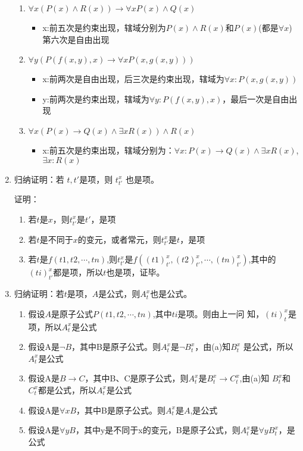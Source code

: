 \documentclass[UTF8]{ctexart}
\begin{document}
\begin{enumerate}
\begin{enumerate}
           \item $\forall x( P(x)\wedge R(x) ) \rightarrow  \forall xP(x) \wedge  Q(x)$
           \begin{itemize}
               \item x:前五次是约束出现，辖域分别为$P(x)\wedge R(x)$和$P(x)$(都是$\forall x$)
               第六次是自由出现
           \end{itemize}
           \item $\forall y( P(f(x, y), x) \rightarrow  \forall xP(x, g(x,y) ) )$
           \begin{itemize}
               \item x:前两次是自由出现，后三次是约束出现，辖域为$\forall x:P(x,g(x,y))$
               \item y:前两次是约束出现，辖域为$\forall y:P(f(x,y),x)$，最后一次是自由出现
           \end{itemize}
           \item $\forall x( P(x) \rightarrow  Q(x) \wedge  \exists xR(x) ) \wedge  R(x)$
           \begin{itemize}
               \item x:前五次是约束出现，辖域分别为：$\forall x:P(x)\rightarrow Q(x)\wedge \exists xR(x)$,
               $\exists x:R(x)$
           \end{itemize}
        \end{enumerate}
       \item 归纳证明：若 $t,t'$是项，则 $t^x_{t'}$ 也是项。   
       
       证明：
       \begin{enumerate}
           \item 若$t$是$x$，则$t^{x}_{t'}$是$t'$，是项
           \item 若$t$是不同于$x$的变元，或者常元，则$t^{x}_{t'}$是$t$，是项
           \item 若$t$是$f(t1,t2,\cdots ,tn)$,则$t^{x}_{t'}$是$f((t1)^{x}_{t'},(t2)^{x}_{t'},\cdots ,(tn)^{x}_{t'})$,其中的
           $(ti)^{x}_{t'}$都是项，所以$t$也是项，证毕。
       \end{enumerate}
       \item  归纳证明：若$t$是项，$A$是公式，则$A^x_t$也是公式。
       \begin{enumerate}
           \item 假设$A$是原子公式$P(t1,t2,\cdots ,tn)$,其中$ti$是项。则由上一问
           知，$(ti)_t^x$是项，所以$A_t^x$是公式
           \item 假设A是$\neg B$，其中B是原子公式。则$A_t^x$是$\neg B_t^x$，由(a)知$B_t^x$
           是公式，所以$A_t^x$是公式
           \item 假设A是$B\rightarrow C$，其中B、C是原子公式，则$A_t^x$是$B_t^x\rightarrow C_t^x$,由(a)知
           $B_t^x$和$C_t^x$都是公式，所以$A_t^x$是公式
           \item 假设A是$\forall x B$，其中B是原子公式。则$A_t^x$是$A$,是公式
           \item 假设A是$\forall y B$，其中y是不同于x的变元，B是原子公式，则$A_t^x$是$\forall y B_t^x$，是公式
           
       \end{enumerate}
    \end{enumerate}
\end{document}
